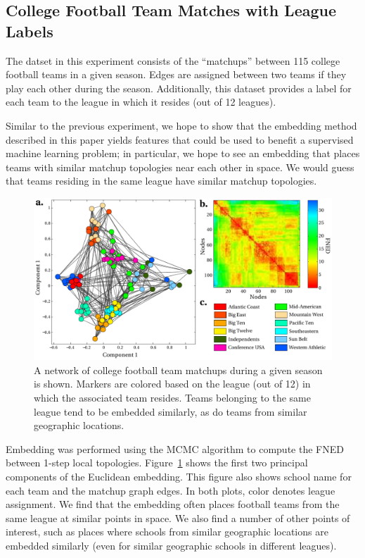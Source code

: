 \documentclass{article}
\begin{document}
\subsection{College Football Team Matches with League Labels}
The datset in this experiment consists of the ``matchups'' between 115 college football teams \cite{newman2006finding} in a given season. Edges are assigned between two teams if they play each other during the season. Additionally, this dataset provides a label for each team to the league in which it resides (out of 12 leagues). 

Similar to the previous experiment, we hope to show that the embedding method described in this paper yields features that could be used to benefit a supervised machine learning problem; in particular, we hope to see an embedding that places teams with similar matchup topologies near each other in space. We would guess that teams residing in the same league have similar matchup topologies.

\begin{figure}[h!tbp]
  \centering               
  \includegraphics[width=1\textwidth]{fig/fig4.pdf}
  \caption{A network of college football team matchups during a given season is shown. Markers are colored based on the league (out of 12) in which the associated team resides. Teams belonging to the same league tend to be embedded similarly, as do teams from similar geographic locations.}
  \label{fig:footballTeams}
\end{figure}

Embedding was performed using the MCMC algorithm to compute the FNED between 1-step local topologies. Figure~\ref{fig:footballTeams} shows the first two principal components of the Euclidean embedding. This figure also shows school name for each team and the matchup graph edges. In both plots, color denotes league assignment. We find that the embedding often places football teams from the same league at similar points in space. We also find a number of other points of interest, such as places where schools from similar geographic locations are embedded similarly (even for similar geographic schools in different leagues).
\end{document}

